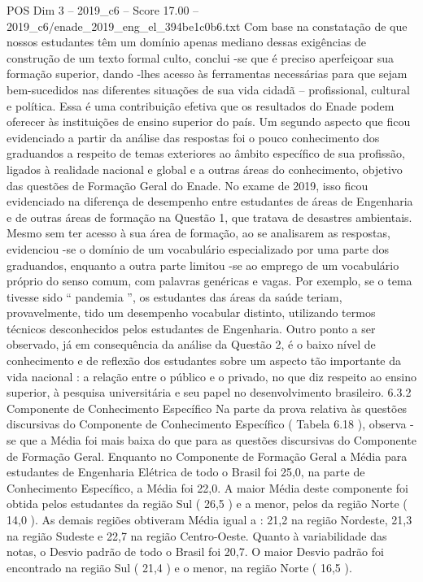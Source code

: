 \begin{textsample}{POS Dim 3 – 2019\_c6 – Score 17.00 – 2019\_c6/enade\_2019\_eng\_el\_394be1c0b6.txt}
Com base na constatação de que nossos estudantes têm um domínio apenas mediano dessas exigências de construção de um texto formal culto, conclui -se que é preciso aperfeiçoar sua formação superior, dando -lhes acesso às ferramentas necessárias para que sejam bem-sucedidos nas diferentes situações de sua vida cidadã – profissional, cultural e política.
Essa é uma contribuição efetiva que os resultados do Enade podem oferecer às instituições de ensino superior do país.
Um segundo aspecto que ficou evidenciado a partir da análise das respostas foi o pouco conhecimento dos graduandos a respeito de temas exteriores ao âmbito específico de sua profissão, ligados à realidade nacional e global e a outras áreas do conhecimento, objetivo das questões de Formação Geral do Enade.
No exame de 2019, isso ficou evidenciado na diferença de desempenho entre estudantes de áreas de Engenharia e de outras áreas de formação na Questão 1, que tratava de desastres ambientais.
Mesmo sem ter acesso à sua área de formação, ao se analisarem as respostas, evidenciou -se o domínio de um vocabulário especializado por uma parte dos graduandos, enquanto a outra parte limitou -se ao emprego de um vocabulário próprio do senso comum, com palavras genéricas e vagas.
Por exemplo, se o tema tivesse sido “ pandemia ”, os estudantes das áreas da saúde teriam, provavelmente, tido um desempenho vocabular distinto, utilizando termos técnicos desconhecidos pelos estudantes de Engenharia.
Outro ponto a ser observado, já em consequência da análise da Questão 2, é o baixo nível de conhecimento e de reflexão dos estudantes sobre um aspecto tão importante da vida nacional : a relação entre o público e o privado, no que diz respeito ao ensino superior, à pesquisa universitária e seu papel no desenvolvimento brasileiro. 6.3.2 Componente de Conhecimento Específico Na parte da prova relativa às questões discursivas do Componente de Conhecimento Específico ( Tabela 6.18 ), observa -se que a Média foi mais baixa do que para as questões discursivas do Componente de Formação Geral.
Enquanto no Componente de Formação Geral a Média para estudantes de Engenharia Elétrica de todo o Brasil foi 25,0, na parte de Conhecimento Específico, a Média foi 22,0.
A maior Média deste componente foi obtida pelos estudantes da região Sul ( 26,5 ) e a menor, pelos da região Norte ( 14,0 ).
As demais regiões obtiveram Média igual a : 21,2 na região Nordeste, 21,3 na região Sudeste e 22,7 na região Centro-Oeste.
Quanto à variabilidade das notas, o Desvio padrão de todo o Brasil foi 20,7.
O maior Desvio padrão foi encontrado na região Sul ( 21,4 ) e o menor, na região Norte ( 16,5 ).

\end{textsample}
